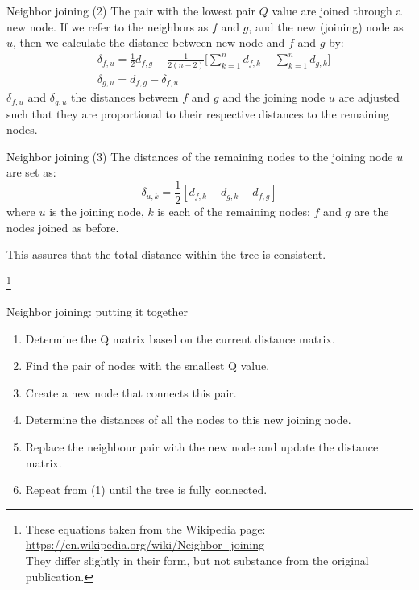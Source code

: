 \documentclass[pdf]{beamer}
\newcommand\blfootnote[1]{%
  \begingroup  %
  \renewcommand\thefootnote{}\footnote{#1}%
  \addtocounter{footnote}{-1}  %
  \endgroup
}
\begin{document}
\begin{frame}{Neighbor joining (2)}
  The pair with the lowest pair $Q$ value are joined through a new node. If we refer to the
  neighbors as $f$ and $g$, and the new (joining) node as $u$, then we calculate the distance
  between new node and $f$ and $g$ by:
  \begin{equation}
    \begin{aligned}
      & \delta_{f,u} = \frac{1}{2}d_{f,g} +
      \frac{1}{2(n-2)}\Bigg[\sum_{k=1}^n{d_{f,k}} - \sum_{k=1}^n{d_{g,k}}
        \Bigg] \\
      & \delta_{g,u} = d_{f,g} - \delta_{f,u}
    \end{aligned}
  \end{equation}
  $\delta_{f,u}$ and $\delta_{g,u}$ the distances between $f$ and $g$ and the
  joining node $u$ are adjusted such that they are proportional to their
  respective distances to the remaining nodes.
\end{frame}

\begin{frame}{Neighbor joining (3)}
  The distances of the remaining nodes to the joining node $u$ are set as:
  $$
  \delta_{u,k} = \frac{1}{2}[d_{f,k} + d_{g,k} - d_{f,g}]
  $$
  where $u$ is the joining node, $k$ is each of the remaining nodes; $f$ and
  $g$ are the nodes joined as before.

  This assures that the total distance within the tree is consistent.

  \blfootnote{These equations taken from the Wikipedia page:\\
    \url{https://en.wikipedia.org/wiki/Neighbor_joining}\\
    They differ slightly in their form, but not substance from the original publication.}
\end{frame}

\begin{frame}{Neighbor joining: putting it together}
  \begin{enumerate}
  \item Determine the Q matrix based on the current distance matrix.
  \item Find the pair of nodes with the smallest Q value.
  \item Create a new node that connects this pair.
  \item Determine the distances of all the nodes to this new joining node.
  \item Replace the neighbour pair with the new node and update the distance
    matrix.
  \item Repeat from (1) until the tree is fully connected.
  \end{enumerate}
  
\end{frame}
\end{document}
